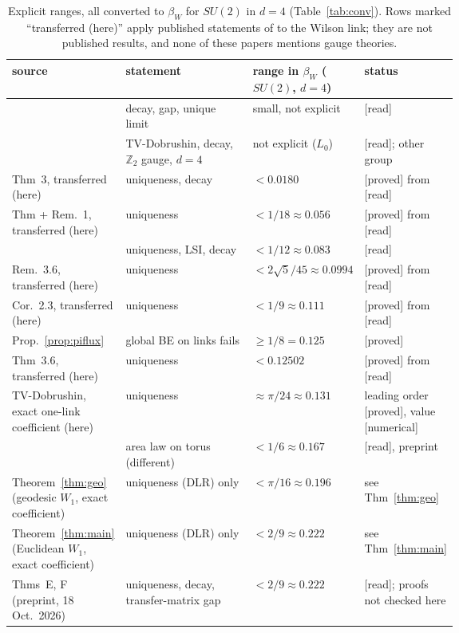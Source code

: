 \documentclass[11pt,a4paper]{article}
\theoremstyle{remark}
\theoremstyle{definition}
\newcommand{\st}[1]{\textsf{[#1]}}
\begin{document}
\begin{table}[htbp]
\centering\small
\begin{tabularx}{\linewidth}{@{}>{\raggedright\arraybackslash}p{0.25\linewidth}>{\raggedright\arraybackslash}X>{\raggedright\arraybackslash}p{0.19\linewidth}>{\raggedright\arraybackslash}p{0.21\linewidth}@{}}
\toprule
source & statement & range in $\beta_W$ ($SU(2)$, $d=4$) & status\\
\midrule
\cite{OS78} & decay, gap, unique limit & small, not explicit & \st{read}\\
\cite{Cha20} & TV-Dobrushin, decay, $\mathbb Z_2$ gauge, $d=4$ & not explicit ($L_0$) & \st{read}; other group\\
\cite{Gro79} Thm~3, transferred (here) & uniqueness, decay & $<0.0180$ & \st{proved} from \st{read}\\
\cite{Sim79} Thm + Rem.~1, transferred (here) & uniqueness & $<1/18\approx0.056$ & \st{proved} from \st{read}\\
\cite{SZZ23} & uniqueness, LSI, decay & $<1/12\approx0.083$ & \st{read}\\
\cite{Lev80} Rem.~3.6, transferred (here) & uniqueness & $<2\sqrt5/45\approx0.0994$ & \st{proved} from \st{read}\\
\cite{Roy86} Cor.~2.3, transferred (here) & uniqueness & $<1/9\approx0.111$ & \st{proved} from \st{read}\\
Prop.~\ref{prop:piflux} & global BE on links fails & $\ge1/8=0.125$ & \st{proved}\\
\cite{Roy86} Thm~3.6, transferred (here) & uniqueness & $<0.12502$ & \st{proved} from \st{read}\\
TV-Dobrushin, exact one-link coefficient (here) & uniqueness & $\approx\pi/24\approx0.131$ & leading order \st{proved}, value \st{numerical}\\
\cite{CNS25} & area law on torus (different) & $<1/6\approx0.167$ & \st{read}, preprint\\
Theorem~\ref{thm:geo} (geodesic $W_1$, exact coefficient) & uniqueness (DLR) only & $<\pi/16\approx0.196$ & see Thm~\ref{thm:geo}\\
Theorem~\ref{thm:main} (Euclidean $W_1$, exact coefficient) & uniqueness (DLR) only & $<2/9\approx0.222$ & see Thm~\ref{thm:main}\\
\cite{BB26} Thms~E, F (preprint, 18 Oct.\ 2026) & uniqueness, decay, transfer-matrix gap & $<2/9\approx0.222$ & \st{read}; proofs not checked here\\
\bottomrule
\end{tabularx}
\caption{Explicit ranges, all converted to $\beta_W$ for $SU(2)$ in $d=4$ (Table~\ref{tab:conv}). Rows marked
``transferred (here)'' apply published statements of \cite{Gro79,Sim79,Lev80,Roy86} to the Wilson link;
they are not published results, and none of these papers mentions gauge theories.}
\label{tab:comp}
\end{table}
\end{document}

